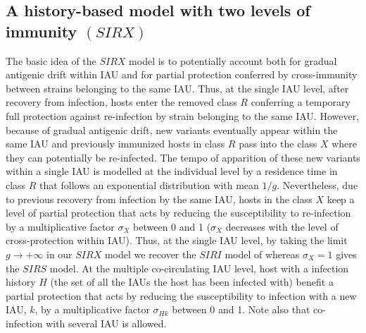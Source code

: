 \subsection{A history-based model with two levels of immunity $(SIRX)$}

The basic idea of the $SIRX$ model is to potentially account both for
gradual antigenic drift within IAU and for partial protection
conferred by cross-immunity between strains belonging to the same IAU.
%
Thus, at the single IAU level, after recovery from infection, hosts
enter the removed class $R$ conferring a temporary full protection
against re-infection by strain belonging to the same IAU.
%
However, because of gradual antigenic drift, new variants eventually
appear within the same IAU and previously immunized hosts in class $R$
pass into the class $X$ where they can potentially be re-infected.
%
The tempo of apparition of these new variants within a single IAU is
modelled at the individual level by a residence time in class $R$ that
follows an exponential distribution with mean $1/g$. Nevertheless, due
to previous recovery from infection by the same IAU, hosts in the
class $X$ keep a level of partial protection that acts by reducing the
susceptibility to re-infection by a multiplicative factor $\sigma_{X}$
between 0 and 1 ($\sigma_{X}$ decreases with the level of
cross-protection within IAU).
%
Thus, at the single IAU level, by taking the limit $g\to+\infty$ in
our $SIRX$ model we recover the $SIRI$ model of \citet{Goekaydin2007}
whereas $\sigma_{X}=1$ gives the $SIRS$ model.
%
At the multiple co-circulating IAU level, host with a infection
history $H$ (the set of all the IAUs the host has been infected with)
benefit a partial protection that acts by reducing the susceptibility
to infection with a new IAU, $k$, by a multiplicative factor
$\sigma_{Hk}$ between 0 and 1. Note also that co-infection with
several IAU is allowed.

